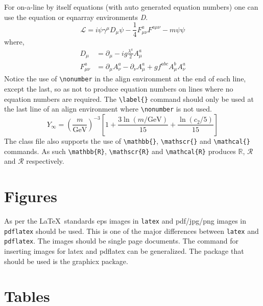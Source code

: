 \documentclass{CUP-JNL-NMJ}%
\theoremstyle{cupplain}
\theoremstyle{cupremark}
\theoremstyle{cupdefinition}
\theoremstyle{cupproof}
\numberwithin{equation}{section}
\begin{document}
For on-a-line by itself equations (with auto generated equation numbers)
one can use the equation or eqnarray environments \textit{D}.
\begin{equation}
\mathcal{L} = i {\psi} \gamma^\mu D_\mu \psi
    - \frac{1}{4} F_{\mu\nu}^a F^{a\mu\nu} - m {\psi} \psi
\label{eq1}
\end{equation}
where,
\begin{align}
D_\mu &=  \partial_\mu - ig \frac{\lambda^a}{2} A^a_\mu
\nonumber \\
F^a_{\mu\nu} &= \partial_\mu A^a_\nu - \partial_\nu A^a_\mu
    + g f^{abc} A^b_\mu A^a_\nu
\label{eq2}
\end{align}
Notice the use of \verb+\nonumber+ in the align environment at the end
of each line, except the last, so as not to produce equation numbers on
lines where no equation numbers are required. The \verb+\label{}+ command
should only be used at the last line of an align environment where
\verb+\nonumber+ is not used.
\begin{equation}
Y_\infty = \left( \frac{m}{\textrm{GeV}} \right)^{-3}
    \left[ 1 + \frac{3 \ln(m/\textrm{GeV})}{15}
    + \frac{\ln(c_2/5)}{15} \right]
\end{equation}
The class file also supports the use of \verb+\mathbb{}+, \verb+\mathscr{}+ and
\verb+\mathcal{}+ commands. As such \verb+\mathbb{R}+, \verb+\mathscr{R}+
and \verb+\mathcal{R}+ produces $\mathbb{R}$, $\mathscr{R}$ and $\mathcal{R}$
respectively.
\section{Figures}

As per the \LaTeX\ standards eps images in \verb!latex! and pdf/jpg/png images in
\verb!pdflatex! should be used. This is one of the major differences between \verb!latex!
and \verb!pdflatex!. The images should be single page documents. The command for inserting images
for latex and pdflatex can be generalized. The package that should be used
is the graphicx package.

\begin{figure}[t]
\end{figure}


\section{Tables}
\end{document}
